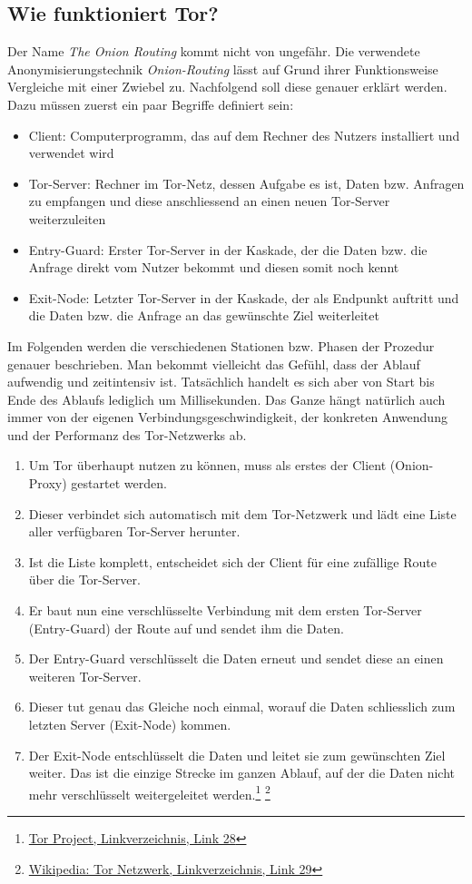 \subsection{Wie funktioniert Tor?}
Der Name \textit{The Onion Routing} kommt nicht von ungefähr. Die verwendete Anonymisierungstechnik \textit{Onion-Routing} lässt auf Grund ihrer Funktionsweise Vergleiche mit einer Zwiebel zu. Nachfolgend soll diese genauer erklärt werden. Dazu müssen zuerst ein paar Begriffe definiert sein:
\begin{itemize}
\item Client: Computerprogramm, das auf dem Rechner des Nutzers installiert und verwendet wird
\item Tor-Server: Rechner im Tor-Netz, dessen Aufgabe es ist, Daten bzw. Anfragen zu empfangen und diese anschliessend an einen neuen Tor-Server weiterzuleiten
\item Entry-Guard: Erster Tor-Server in der Kaskade, der die Daten bzw. die Anfrage direkt vom Nutzer bekommt und diesen somit noch kennt
\item Exit-Node: Letzter Tor-Server in der Kaskade, der als Endpunkt auftritt und die Daten bzw. die Anfrage an das gewünschte Ziel weiterleitet
\end{itemize}

Im Folgenden werden die verschiedenen Stationen bzw. Phasen der Prozedur genauer beschrieben. Man bekommt vielleicht das Gefühl, dass der Ablauf aufwendig und zeitintensiv ist. Tatsächlich handelt es sich aber von Start bis Ende des Ablaufs lediglich um Millisekunden. Das Ganze hängt natürlich auch immer von der eigenen Verbindungsgeschwindigkeit, der konkreten Anwendung und der Performanz des Tor-Netzwerks ab.

\begin{enumerate}
\item Um Tor überhaupt nutzen zu können, muss als erstes der  Client (Onion-Proxy) gestartet werden.
\item Dieser verbindet sich automatisch mit dem Tor-Netzwerk und lädt eine Liste aller verfügbaren Tor-Server herunter.
\item Ist die Liste komplett, entscheidet sich der Client für eine zufällige Route über die Tor-Server.
\item Er baut nun eine verschlüsselte Verbindung mit dem ersten Tor-Server (Entry-Guard) der Route auf und sendet ihm die Daten.
\item Der Entry-Guard verschlüsselt die Daten erneut und sendet diese an einen weiteren Tor-Server.
\item Dieser tut genau das Gleiche noch einmal, worauf die Daten schliesslich zum letzten Server (Exit-Node) kommen.
\item Der Exit-Node entschlüsselt die Daten und leitet sie zum gewünschten Ziel weiter. Das ist die einzige Strecke im ganzen Ablauf, auf der die Daten nicht mehr verschlüsselt weitergeleitet werden.\footnote{\hyperlink{link28}{Tor Project, Linkverzeichnis, Link 28}}
  \footnote{\hyperlink{link29}{Wikipedia: Tor Netzwerk, Linkverzeichnis, Link 29}}
\end{enumerate}

